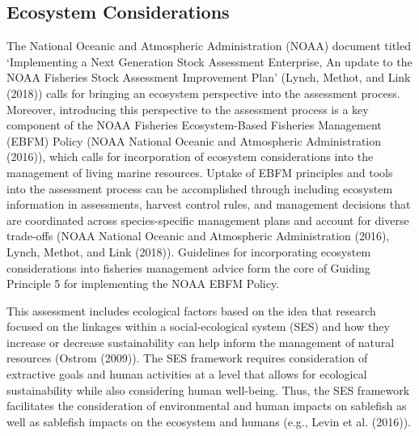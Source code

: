 \documentclass[11pt,
  english,
  a4paper,
]{article}
\begin{document}
\tagmcend\tagstructend


\hypertarget{ecosystem-considerations}{%
\subsection*{Ecosystem Considerations}\label{ecosystem-considerations}}

\leavevmode\tagmcend\tagstructend


The National Oceanic and Atmospheric Administration (NOAA) document titled `Implementing a Next Generation Stock Assessment Enterprise, An update to the NOAA Fisheries Stock Assessment Improvement Plan' ({Lynch, Methot, and Link (2018)\leavevmode\tagmcend\tagstructend}) calls for bringing an ecosystem perspective into the assessment process. Moreover, introducing this perspective to the assessment process is a key component of the NOAA Fisheries Ecosystem-Based Fisheries Management (EBFM) Policy ({NOAA National Oceanic and Atmospheric Administration (2016)\leavevmode\tagmcend\tagstructend}), which calls for incorporation of ecosystem considerations into the management of living marine resources. Uptake of EBFM principles and tools into the assessment process can be accomplished through including ecosystem information in assessments, harvest control rules, and management decisions that are coordinated across species-specific management plans and account for diverse trade-offs ({NOAA National Oceanic and Atmospheric Administration (2016)\leavevmode\tagmcend\tagstructend}, {Lynch, Methot, and Link (2018)\leavevmode\tagmcend\tagstructend}). Guidelines for incorporating ecosystem considerations into fisheries management advice form the core of Guiding Principle 5 for implementing the NOAA EBFM Policy.

\leavevmode\tagmcend\tagstructend\par


This assessment includes ecological factors based on the idea that research focused on the linkages within a social-ecological system (SES) and how they increase or decrease sustainability can help inform the management of natural resources ({Ostrom (2009)\leavevmode\tagmcend\tagstructend}). The SES framework requires consideration of extractive goals and human activities at a level that allows for ecological sustainability while also considering human well-being. Thus, the SES framework facilitates the consideration of environmental and human impacts on sablefish as well as sablefish impacts on the ecosystem and humans (e.g., {Levin et al. (2016)\leavevmode\tagmcend\tagstructend}).
\end{document}
